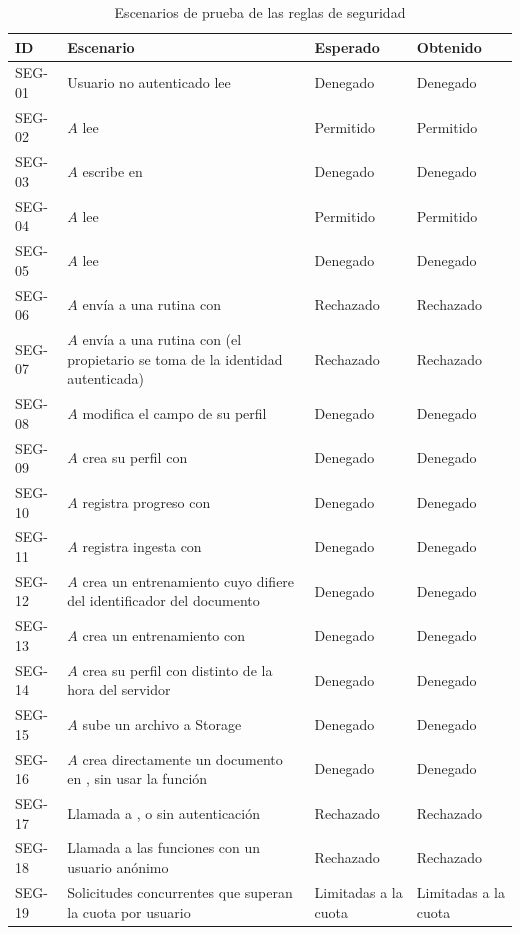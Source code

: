 \begin{table}[H]
\centering
\caption{Escenarios de prueba de las reglas de seguridad}
\label{tab:prueba-reglas}
\footnotesize
\begin{tabularx}{\textwidth}{|L{1.3cm}|Y|C{1.8cm}|C{1.9cm}|}
\hline
{} \textbf{ID} & \textbf{Escenario} & \textbf{Esperado} & \textbf{Obtenido} \\
\hline
SEG-01 & Usuario no autenticado lee  & Denegado & Denegado \\ \hline
SEG-02 & $A$ lee  & Permitido & Permitido \\ \hline
SEG-03 & $A$ escribe en  & Denegado & Denegado \\ \hline
SEG-04 & $A$ lee  & Permitido & Permitido \\ \hline
SEG-05 & $A$ lee  & Denegado & Denegado \\ \hline
SEG-06 & $A$ envía a  una rutina con
 & Rechazado & Rechazado \\ \hline
SEG-07 & $A$ envía a  una rutina con
 (el propietario se toma de la identidad autenticada) & Rechazado & Rechazado \\ \hline
SEG-08 & $A$ modifica el campo  de su perfil & Denegado & Denegado \\ \hline
SEG-09 & $A$ crea su perfil con  & Denegado & Denegado \\ \hline
SEG-10 & $A$ registra progreso con  & Denegado & Denegado \\ \hline
SEG-11 & $A$ registra ingesta con  & Denegado & Denegado \\ \hline
SEG-12 & $A$ crea un entrenamiento cuyo  difiere del
identificador del documento & Denegado & Denegado \\ \hline
SEG-13 & $A$ crea un entrenamiento con  & Denegado & Denegado \\ \hline
SEG-14 & $A$ crea su perfil con  distinto de la hora del
servidor & Denegado & Denegado \\ \hline
SEG-15 & $A$ sube un archivo a Storage & Denegado & Denegado \\ \hline
SEG-16 & $A$ crea directamente un documento en ,
sin usar la función & Denegado & Denegado \\ \hline
SEG-17 & Llamada a ,  o
 sin autenticación & Rechazado & Rechazado \\ \hline
SEG-18 & Llamada a las funciones con un usuario anónimo & Rechazado & Rechazado \\ \hline
SEG-19 & Solicitudes concurrentes que superan la cuota por usuario & Limitadas a la cuota & Limitadas a la cuota \\
\hline
\end{tabularx}
\end{table}

